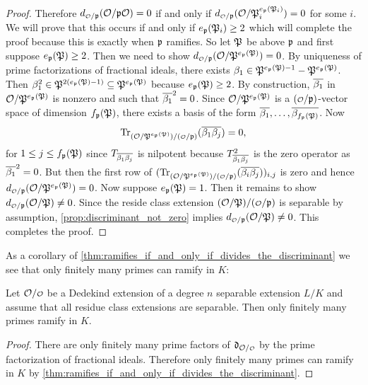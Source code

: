 \begin{proof}
      Therefore $d_{\smc{O}/\mf{p}}(\mc{O}/\mf{p}\mc{O}) = 0$ if and only if $d_{\smc{O}/\mf{p}}(\mc{O}/\mf{P}_{i}^{e_{\mf{p}}(\mf{P}_{i})}) = 0$ for some $i$. We will prove that this occurs if and only if $e_{\mathfrak{p}}(\mathfrak{P}_{i}) \ge 2$ which will complete the proof because this is exactly when $\mathfrak{p}$ ramifies. So let $\mathfrak{P}$ be above $\mathfrak{p}$ and first suppose $e_{\mathfrak{p}}(\mathfrak{P}) \ge 2$. Then we need to show $d_{\smc{O}/\mf{p}}(\mc{O}/\mf{P}^{e_{\mf{p}}(\mf{P})}) = 0$. By uniqueness of prime factorizations of fractional ideals, there exists $\beta_{1} \in \mathfrak{P}^{e_{\mathfrak{p}}(\mathfrak{P})-1}-\mathfrak{P}^{e_{\mathfrak{p}}(\mathfrak{P})}$. Then $\beta_{1}^{2} \in \mathfrak{P}^{2(e_{\mathfrak{p}}(\mathfrak{P})-1)} \subseteq \mathfrak{P}^{e_{\mathfrak{p}}(\mathfrak{P})}$ because $e_{\mathfrak{p}}(\mathfrak{P}) \ge 2$. By construction, $\overline{\beta_{1}}$ in $\mathcal{O}/\mathfrak{P}^{e_{\mathfrak{p}}(\mathfrak{P})}$ is nonzero and such that $\overline{\beta_{1}}^{2} = 0$. Since $\mathcal{O}/\mathfrak{P}^{e_{\mathfrak{p}}(\mathfrak{P})}$ is a $(\smc{O}/\mf{p})$-vector space of dimension $f_{\mathfrak{p}}(\mathfrak{P})$, there exists a basis of the form $\overline{\beta_{1}},\ldots,\overline{\beta_{f_{\mathfrak{p}}(\mathfrak{P})}}$. Now
      \[
        \Trace_{(\mc{O}/\mf{P}^{e_{\mf{p}}(\mf{P})})/(\smc{O}/\mf{p})}(\conj{\b_{1}\b_{j}}) = 0,
      \]
      for $1 \le j \le f_{\mathfrak{p}}(\mathfrak{P})$ since $T_{\overline{\beta_{1}}\overline{\beta_{j}}}$ is nilpotent because $T_{\overline{\beta_{1}}\overline{\beta_{j}}}^{2}$ is the zero operator as $\overline{\beta_{1}}^{2} = 0$. But then the first row of $(\Trace_{(\mc{O}/\mf{P}^{e_{\mf{p}}(\mf{P})})/(\smc{O}/\mf{p})}(\conj{\b_{i}\b_{j}}))_{i,j}$ is zero and hence $d_{\smc{O}/\mf{p}}(\mc{O}/\mf{P}^{e_{\mf{p}}(\mf{P})}) = 0$. Now suppose $e_{\mathfrak{p}}(\mathfrak{P}) = 1$. Then it remains to show $d_{\smc{O}/\mf{p}}(\mc{O}/\mf{P}) \neq 0$. Since the reside class extension $(\mc{O}/\mf{P})/(\smc{O}/\mf{p})$ is separable by assumption, \cref{prop:discriminant_not_zero} implies $d_{\smc{O}/\mf{p}}(\mc{O}/\mf{P}) \neq 0$. This completes the proof.
    \end{proof}

    As a corollary of \cref{thm:ramifies_if_and_only_if_divides_the_discriminant} we see that only finitely many primes can ramify in $K$:

    \begin{corollary}\label{cor:finitely_many_primes_ramify_K}
      Let $\mc{O}/\smc{O}$ be a Dedekind extension of a degree $n$ separable extension $L/K$ and assume that all residue class extensions are separable. Then only finitely many primes ramify in $K$.
    \end{corollary}
    \begin{proof}
      There are only finitely many prime factors of $\mf{d}_{\mc{O}/\smc{O}}$ by the prime factorization of fractional ideals. Therefore only finitely many primes can ramify in $K$ by \cref{thm:ramifies_if_and_only_if_divides_the_discriminant}.
    \end{proof}

